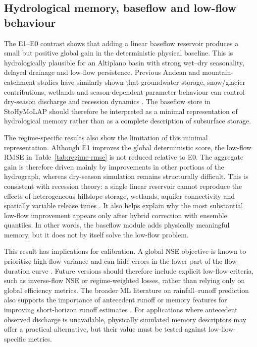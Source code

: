 \subsection{Hydrological memory, baseflow and low-flow behaviour}
\label{subsec:discussion-baseflow}

The E1--E0 contrast shows that adding a linear baseflow reservoir
produces a small but positive global gain in the deterministic physical
baseline. This is hydrologically plausible for an Altiplano basin with
strong wet--dry seasonality, delayed drainage and low-flow persistence.
Previous Andean and mountain-catchment studies have similarly shown
that groundwater storage, snow/glacier contributions, wetlands and
season-dependent parameter behaviour can control dry-season discharge
and recession dynamics \citep{nauditt2017conceptual,ragettli2014evaluation,condom2004transient,lima2025modeling}. The baseflow store in
StoHyMoLAP should therefore be interpreted as a minimal representation
of hydrological memory rather than as a complete description of
subsurface storage.

The regime-specific results also show the limitation of this minimal
representation. Although E1 improves the global deterministic score, the
low-flow RMSE in Table~\ref{tab:regime-rmse} is not reduced relative to
E0. The aggregate gain is therefore driven mainly by improvements in
other portions of the hydrograph, whereas dry-season simulation remains
structurally difficult. This is consistent with recession theory: a
single linear reservoir cannot reproduce the effects of heterogeneous
hillslope storage, wetlands, aquifer connectivity and spatially variable
release times \citep{harman2009power,van2013influence}. It also helps
explain why the most substantial low-flow improvement appears only after
hybrid correction with ensemble quantiles. In other words, the baseflow
module adds physically meaningful memory, but it does not by itself
solve the low-flow problem.

This result has implications for calibration. A global NSE objective is
known to prioritize high-flow variance and can hide errors in the lower
part of the flow-duration curve \citep{pushpalatha2012review}. Future
versions should therefore include explicit low-flow criteria, such as
inverse-flow NSE or regime-weighted losses, rather than relying only on
global efficiency metrics. The broader ML literature on rainfall--runoff
prediction also supports the importance of antecedent runoff or memory
features for improving short-horizon runoff estimates
\citep{adnan2021comparison,okkan2021embedding}. For applications where
antecedent observed discharge is unavailable, physically simulated
memory descriptors may offer a practical alternative, but their value
must be tested against low-flow-specific metrics.

